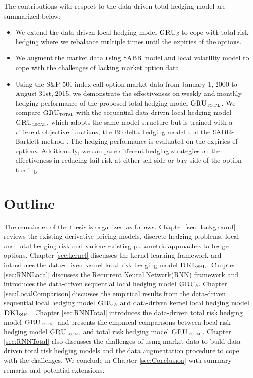 \documentclass[letterpaper,12pt,titlepage,oneside,final]{book}
\numberwithin{equation}{section}
\theoremstyle{definition}
\newcommand{\model}{\textsc{GRU}_\delta}
\newcommand{\modelT}{\textsc{GRU}_{\textsc{total}}}
\newcommand{\modelL}{\textsc{GRU}_{\textsc{local}}}
\newcommand{\DKLs}{\bf\textsc{DKL}_{\text{SPL}}}
\begin{document}
The contributions with respect to the data-driven total hedging model \cite{knian2020} are summarized below:
\begin{itemize}
	\item  We extend the data-driven local hedging model $\model$ \cite{knian2019} to cope with total risk hedging  where we rebalance multiple times until the expiries of the options.
	\item  We augment the market data using SABR model and local volatility model to cope with the challenges of lacking market option data.
	\item  Using the S\&P 500 index call option market data from January 1, 2000 to  August 31st, 2015, we demonstrate the effectiveness on  weekly and monthly hedging performance of the proposed total hedging model $\modelT$. We compare $\modelT$ with the sequential data-driven local hedging model $\modelL$, which adopts the same model structure but is trained with a different  objective functions, the BS delta hedging model and the SABR-Bartlett method \cite{bartlett2006hedging}. The hedging performance is evaluated on the expiries of  options. Additionally, we compare different hedging strategies on the effectiveness in reducing  tail risk at either sell-side or buy-side of the option trading.

\end{itemize}
\section{Outline}
The remainder of the thesis is organized as follows.
Chapter \ref{sec:Background}  reviews the existing derivative pricing models, discrete hedging problems, local and total hedging risk and various existing parametric approaches to hedge options.
Chapter \ref{sec:kernel}  discusses the kernel learning framework and introduces the data-driven kernel local risk hedging model $\DKLs$. 
Chapter \ref{sec:RNNLocal} discusses the Recurrent Neural Network(RNN) framework and introduces the data-driven sequential local hedging model $\model$.
Chapter \ref{sec:LocalComparison} discusses the  empirical results  from  the data-driven sequential local hedging model $\model$ and data-driven kernel local hedging model $\DKLs$. Chapter \ref{sec:RNNTotal} introduces the data-driven  total risk hedging model $\modelT$ and presents the empirical comparisons between local risk hedging model $\modelL$ and total risk hedging model $\modelT$.
Chapter \ref{sec:RNNTotal}  also discusses the challenges of using market data to build data-driven total risk hedging models and the data augmentation procedure to cope with the challenges.
We conclude in Chapter \ref{sec:Conclusion}  with summary remarks and potential extensions.
\end{document}
